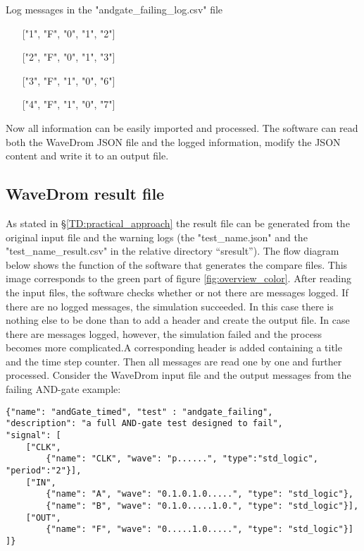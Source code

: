 \begin{customenv}
	\caption{Log messages in the "andgate\_failing\_log.csv" file}
	\begin{itemize}
		\centering
		\item [] ["1", "F", "0", "1", "2"]
		\item [] ["2", "F", "0", "1", "3"]
		\item [] ["3", "F", "1", "0", "6"]
		\item [] ["4", "F", "1", "0", "7"]
	\end{itemize}
\end{customenv}\nline
Now all information can be easily imported and processed. The software can read both the WaveDrom JSON file and the logged information, modify the JSON content and write it to an output file.
\newpage\noindent
\subsection{WaveDrom result file}
As stated in §\ref{TD:practical_approach} the result file can be generated from the original input file and the warning logs (the "test\_name.json" and the "test\_name\_result.csv" in the relative directory “sresult”). The flow diagram below shows the function of the software that generates the compare files. This image corresponds to the green part of figure \ref{fig:overview_color}. \newpage\noindent
After reading the input files, the software checks whether or not there are messages logged. If there are no logged messages, the simulation succeeded. In this case there is nothing else to be done than to add a header and create the output file. In case there are messages logged,  however, the simulation failed and the process becomes more complicated.A corresponding header is added containing a title and the time step counter. Then all messages are read one by one and further processed.
\npar
Consider the WaveDrom input file and the output messages from the failing AND-gate example:
\begin{lstlisting}[style=json, caption={Source file for a failing AND-gate example}, label={json:andgate_failing}]
{"name": "andGate_timed", "test" : "andgate_failing", 
"description": "a full AND-gate test designed to fail", 
"signal": [
	["CLK",
		{"name": "CLK", "wave": "p......", "type":"std_logic", "period":"2"}],
	["IN",
		{"name": "A", "wave": "0.1.0.1.0.....", "type": "std_logic"},
		{"name": "B", "wave": "0.1.0.....1.0.", "type": "std_logic"}],
	["OUT",
		{"name": "F", "wave": "0.....1.0.....", "type": "std_logic"}]
]}
\end{lstlisting}\noindent
